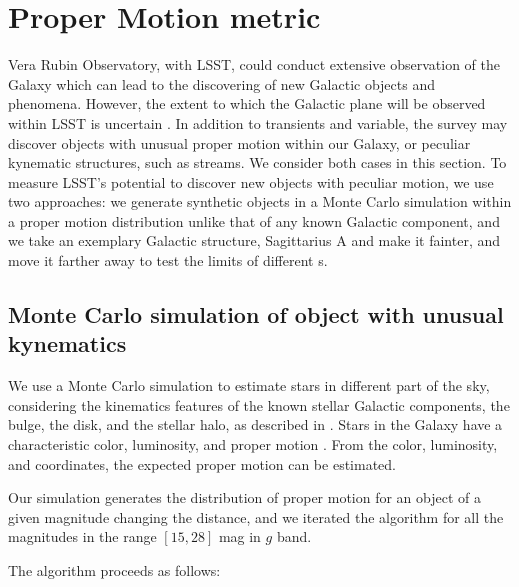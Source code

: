 \newcommand{\red}[1]{{\color{red} #1}}


%
\section{Proper Motion metric}


Vera Rubin Observatory, with LSST, could conduct extensive observation of the Galaxy which can lead to the discovering of new Galactic objects and phenomena. However, the extent to which the Galactic plane will be observed within LSST is uncertain . In addition to transients and variable, the survey may discover objects with unusual proper motion within our Galaxy, or peculiar kynematic structures, such as streams. We consider both cases in this section. 
To measure LSST's potential to discover new objects with peculiar motion, we use two approaches: we generate synthetic objects in a Monte Carlo simulation within a proper motion distribution unlike that of any known Galactic component, and we take an exemplary Galactic structure, Sagittarius A and make it fainter, and move it farther away to test the limits of different \opsim s. 

\subsection {Monte Carlo simulation of object with unusual kynematics}
We use a Monte Carlo simulation to estimate 
 stars in different part of the sky, considering the kinematics features of the known stellar Galactic components, the bulge, 
the disk, and the stellar halo, as described in \citet{Binney2008}. 
Stars in the Galaxy have a characteristic color, luminosity, and proper motion . From the color, luminosity, and coordinates, the expected proper motion can be estimated. 

Our simulation generates the distribution of proper motion for an object of a given magnitude changing the distance, and we iterated the algorithm for all the magnitudes in the range $[15,28]$ mag in $g$ band. 

The algorithm proceeds as follows:

